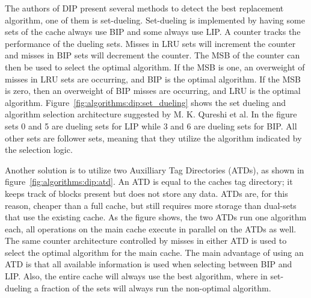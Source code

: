 The authors of DIP present several methods to detect the best replacement algorithm, one of them is set-dueling.
Set-dueling is implemented by having some sets of the cache always use BIP and some always use LIP.
A counter tracks the performance of the dueling sets.
Misses in LRU sets will increment the counter and misses in BIP sets will decrement the counter.
The MSB of the counter can then be used to select the optimal algorithm.
If the MSB is one, an overweight of misses in LRU sets are occurring, and BIP is the optimal algorithm. 
If the MSB is zero, then an overweight of BIP misses are occurring, and LRU is the optimal algorithm.
Figure~\ref{fig:algorithms:dip:set_dueling} shows the set dueling and algorithm selection architecture suggested by M. K. Qureshi et al.
In the figure sets 0 and 5 are dueling sets for LIP while 3 and 6 are dueling sets for BIP.
All other sets are follower sets, meaning that they utilize the algorithm indicated by the selection logic.

Another solution is to utilize two Auxilliary Tag Directories (ATDs), as shown in figure~\ref{fig:algorithms:dip:atd}.
An ATD is equal to the caches tag directory; it keeps track of blocks present but does not store any data.
ATDs are, for this reason, cheaper than a full cache, but still requires more storage than dual-sets that use the existing cache.
As the figure shows, the two ATDs run one algorithm each, all operations on the main cache execute in parallel on the ATDs as well.
The same counter architecture controlled by misses in either ATD is used to select the optimal algorithm for the main cache.
The main advantage of using an ATD is that all available information is used when selecting between BIP and LIP.
Also, the entire cache will always use the best algorithm, where in set-dueling a fraction of the sets will always run the non-optimal algorithm.
